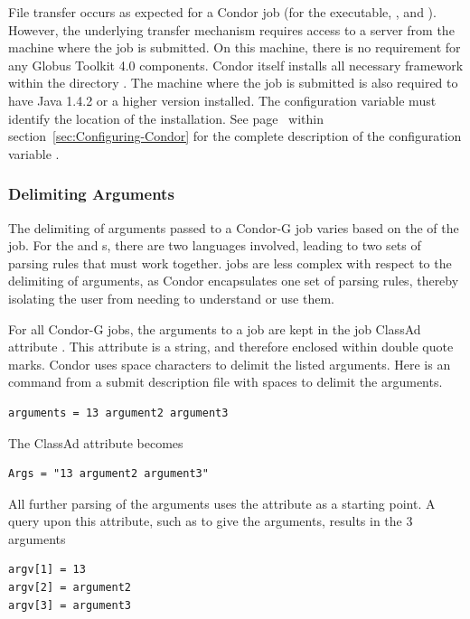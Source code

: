 
File transfer occurs as expected for a Condor job 
(for the executable, , and ).
However, the underlying transfer mechanism requires access
to a  server from the machine where the job
is submitted.
On this machine,
there is no requirement for any Globus Toolkit 4.0 components.
Condor itself installs all necessary framework within the directory 
.
The machine where the job is submitted
is also required to
have Java 1.4.2 or a higher version installed.
The configuration variable 
must identify the location of the installation.
See page~\pageref{param:Java} within
section~\ref{sec:Configuring-Condor}
for the complete description of the configuration variable .


\subsubsection{\label{sec:CondorG-Submit-Args}Delimiting Arguments}

The delimiting of arguments passed to a Condor-G 
job varies based on the  of the job.
For the  and  s,
there are two languages involved, 
leading to two sets of parsing rules that must work together.
  jobs
are less complex with respect to the delimiting of arguments,
as Condor encapsulates one set of parsing rules,
thereby isolating the user from needing to understand or use them.

For all Condor-G jobs,
the arguments to a job are kept in the job ClassAd attribute
.
This attribute is a string, and therefore enclosed within
double quote marks.
Condor uses space characters to delimit the listed
arguments.
Here is an  command from a submit
description file with spaces to delimit the arguments.
\footnotesize
\begin{verbatim}
arguments = 13 argument2 argument3
\end{verbatim}
\normalsize
The  ClassAd attribute becomes
\footnotesize
\begin{verbatim}
Args = "13 argument2 argument3"
\end{verbatim}
\normalsize
All further parsing of the arguments uses the 
attribute as a starting point.
A query upon this attribute, such as to give the arguments,
results in the 3 arguments
\begin{verbatim}
argv[1] = 13
argv[2] = argument2
argv[3] = argument3
\end{verbatim}

